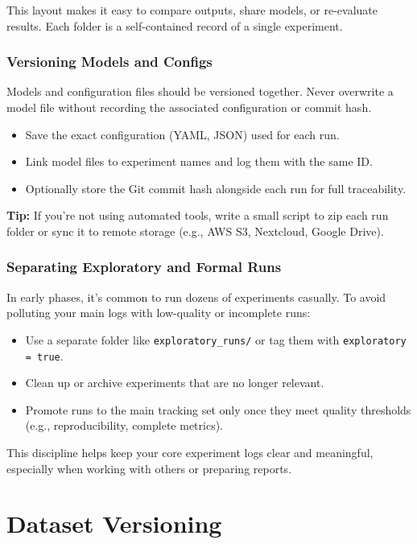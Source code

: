 \documentclass[12pt,openany]{book}
\begin{document}
This layout makes it easy to compare outputs, share models, or re-evaluate results. Each folder is a self-contained record of a single experiment.

\subsection{Versioning Models and Configs}

Models and configuration files should be versioned together. Never overwrite a model file without recording the associated configuration or commit hash.

\begin{itemize}
    \item Save the exact configuration (YAML, JSON) used for each run.
    \item Link model files to experiment names and log them with the same ID.
    \item Optionally store the Git commit hash alongside each run for full traceability.
\end{itemize}

\textbf{Tip:} If you're not using automated tools, write a small script to zip each run folder or sync it to remote storage (e.g., AWS S3, Nextcloud, Google Drive).

\subsection{Separating Exploratory and Formal Runs}

In early phases, it's common to run dozens of experiments casually. To avoid polluting your main logs with low-quality or incomplete runs:

\begin{itemize}
    \item Use a separate folder like \texttt{exploratory\_runs/} or tag them with \texttt{exploratory = true}.
    \item Clean up or archive experiments that are no longer relevant.
    \item Promote runs to the main tracking set only once they meet quality thresholds (e.g., reproducibility, complete metrics).
\end{itemize}

This discipline helps keep your core experiment logs clear and meaningful, especially when working with others or preparing reports.




\chapter{Dataset Versioning}
\end{document}

